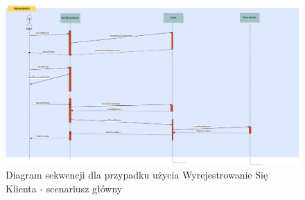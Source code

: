   
  
  \begin{figure}[h!]
    \includegraphics[width=\textwidth,
    height=0.5\textheight]{graphics/UseCase/Klient/WyrejestrowanieSieKlientaSD.png}
    \caption{Diagram sekwencji dla przypadku użycia Wyrejestrowanie Się Klienta
    - scenariusz główny}
\end{figure}
  
  
 